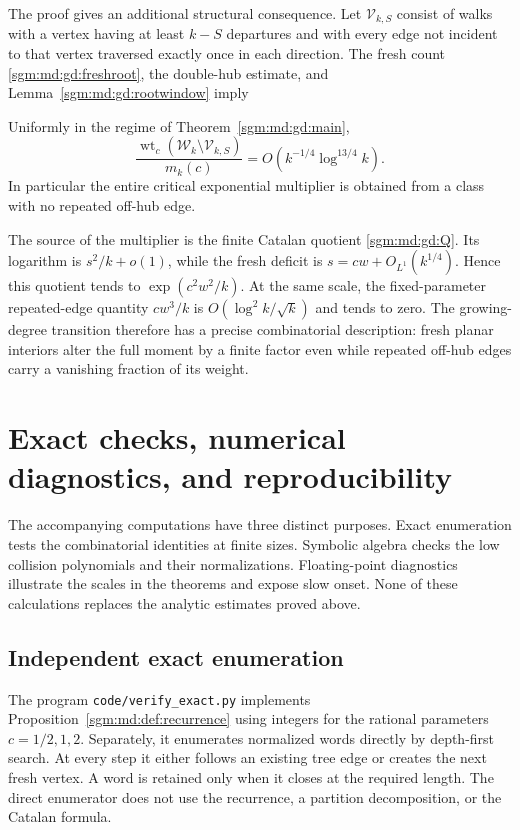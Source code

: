 \documentclass[11pt,letterpaper]{article}
\theoremstyle{remark}\newtheorem{remark}[theorem]{Remark}
\newcommand{\Wc}{\mathcal W}\newcommand{\Uc}{\mathcal U}\newcommand{\Part}{\operatorname{Part}}
\theoremstyle{definition}\newtheorem{definition}[theorem]{Definition}
\begin{document}
The proof gives an additional structural consequence.  Let
$\mathcal V_{k,S}$ consist of walks with a vertex having at least
$k-S$ departures and with every edge not incident to that vertex
traversed exactly once in each direction.  The fresh count
\eqref{sgm:md:gd:freshroot}, the double-hub estimate, and
Lemma~\ref{sgm:md:gd:rootwindow} imply
\begin{corollary}\label{sgm:md:gd:simpledominance}
Uniformly in the regime of Theorem~\ref{sgm:md:gd:main},
\[
 \frac{\operatorname{wt}_c(\Wc_k\setminus\mathcal V_{k,S})}{m_k(c)}
 =O(k^{-1/4}\log^{13/4}k).
\]
In particular the entire critical exponential multiplier is obtained
from a class with no repeated off-hub edge.
\end{corollary}

The source of the multiplier is the finite Catalan quotient
\eqref{sgm:md:gd:Q}.  Its logarithm is $s^2/k+o(1)$, while the fresh deficit
is $s=cw+O_{L^1}(k^{1/4})$.  Hence this quotient tends to
$\exp(c^2w^2/k)$.  At the same scale, the fixed-parameter repeated-edge
quantity $cw^3/k$ is $O(\log^2k/\sqrt{k})$ and tends to zero.
The growing-degree transition therefore has a precise combinatorial
description: fresh planar interiors alter the full moment by a finite
factor even while repeated off-hub edges carry a vanishing fraction of
its weight.
\section{Exact checks, numerical diagnostics, and reproducibility}
\label{sgm:md:sec:verification}

The accompanying computations have three distinct purposes. Exact
enumeration tests the combinatorial identities at finite sizes.
Symbolic algebra checks the low collision polynomials and their
normalizations. Floating-point diagnostics illustrate the scales in
the theorems and expose slow onset. None of these calculations replaces
the analytic estimates proved above.

\subsection{Independent exact enumeration}

The program \texttt{code/verify\_exact.py} implements
Proposition~\ref{sgm:md:def:recurrence} using integers for the rational
parameters $c=1/2,1,2$. Separately, it enumerates normalized words
directly by depth-first search. At every step it either follows an
existing tree edge or creates the next fresh vertex. A word is retained
only when it closes at the required length. The direct enumerator does
not use the recurrence, a partition decomposition, or the Catalan
formula.
\end{document}
